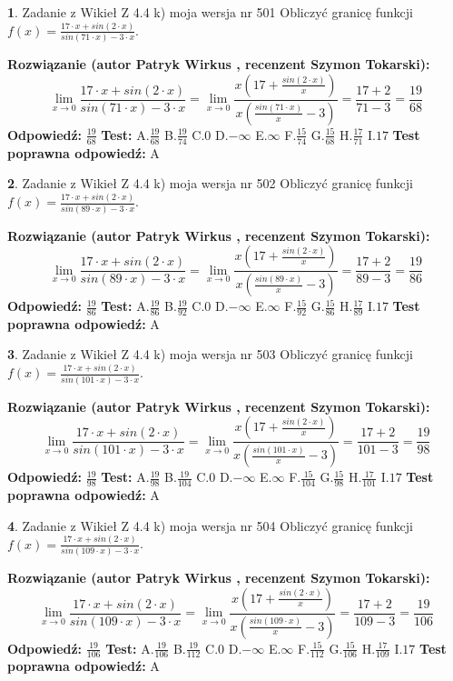 \documentclass[12pt, a4paper]{article}
\theoremstyle{definition} %
\newtheorem{zad}{}
\newcommand{\zadStart}[1]{\begin{zad}#1\newline}
\newcommand{\zadStop}{\end{zad}}
\newcommand{\rozwStart}[2]{\noindent \textbf{Rozwiązanie (autor #1 , recenzent #2): }\newline}
\newcommand{\rozwStop}{\newline}
\newcommand{\odpStart}{\noindent \textbf{Odpowiedź:}\newline}
\newcommand{\odpStop}{\newline}
\newcommand{\testStart}{\noindent \textbf{Test:}\newline}
\newcommand{\testStop}{\newline}
\newcommand{\kluczStart}{\noindent \textbf{Test poprawna odpowiedź:}\newline}
\newcommand{\kluczStop}{\newline}
\begin{document}
\zadStart{Zadanie z Wikieł Z 4.4 k) moja wersja nr 501}
Obliczyć granicę funkcji $f(x)=\frac{17\cdot x +sin(2\cdot x)}{sin(71\cdot x) -3\cdot x}$.
\zadStop
\rozwStart{Patryk Wirkus}{Szymon Tokarski}
$$\lim\limits_{x\to 0}\frac{17\cdot x +sin(2\cdot x)}{sin(71\cdot x) -3\cdot x}
=\lim\limits_{x\to 0}\frac{x(17+\frac{sin(2\cdot x)}{x})}{x(\frac{sin(71\cdot x)}{x}-3)}
=\frac{17+2}{71-3} = \frac{19}{68}$$
\rozwStop
\odpStart
$\frac{19}{68}$
\odpStop
\testStart
A.$\frac{19}{68}$
B.$\frac{19}{74}$
C.$0$
D.$-\infty$
E.$\infty$
F.$\frac{15}{74}$
G.$\frac{15}{68}$
H.$\frac{17}{71}$
I.$17$
\testStop
\kluczStart
A
\kluczStop



\zadStart{Zadanie z Wikieł Z 4.4 k) moja wersja nr 502}
Obliczyć granicę funkcji $f(x)=\frac{17\cdot x +sin(2\cdot x)}{sin(89\cdot x) -3\cdot x}$.
\zadStop
\rozwStart{Patryk Wirkus}{Szymon Tokarski}
$$\lim\limits_{x\to 0}\frac{17\cdot x +sin(2\cdot x)}{sin(89\cdot x) -3\cdot x}
=\lim\limits_{x\to 0}\frac{x(17+\frac{sin(2\cdot x)}{x})}{x(\frac{sin(89\cdot x)}{x}-3)}
=\frac{17+2}{89-3} = \frac{19}{86}$$
\rozwStop
\odpStart
$\frac{19}{86}$
\odpStop
\testStart
A.$\frac{19}{86}$
B.$\frac{19}{92}$
C.$0$
D.$-\infty$
E.$\infty$
F.$\frac{15}{92}$
G.$\frac{15}{86}$
H.$\frac{17}{89}$
I.$17$
\testStop
\kluczStart
A
\kluczStop



\zadStart{Zadanie z Wikieł Z 4.4 k) moja wersja nr 503}
Obliczyć granicę funkcji $f(x)=\frac{17\cdot x +sin(2\cdot x)}{sin(101\cdot x) -3\cdot x}$.
\zadStop
\rozwStart{Patryk Wirkus}{Szymon Tokarski}
$$\lim\limits_{x\to 0}\frac{17\cdot x +sin(2\cdot x)}{sin(101\cdot x) -3\cdot x}
=\lim\limits_{x\to 0}\frac{x(17+\frac{sin(2\cdot x)}{x})}{x(\frac{sin(101\cdot x)}{x}-3)}
=\frac{17+2}{101-3} = \frac{19}{98}$$
\rozwStop
\odpStart
$\frac{19}{98}$
\odpStop
\testStart
A.$\frac{19}{98}$
B.$\frac{19}{104}$
C.$0$
D.$-\infty$
E.$\infty$
F.$\frac{15}{104}$
G.$\frac{15}{98}$
H.$\frac{17}{101}$
I.$17$
\testStop
\kluczStart
A
\kluczStop



\zadStart{Zadanie z Wikieł Z 4.4 k) moja wersja nr 504}
Obliczyć granicę funkcji $f(x)=\frac{17\cdot x +sin(2\cdot x)}{sin(109\cdot x) -3\cdot x}$.
\zadStop
\rozwStart{Patryk Wirkus}{Szymon Tokarski}
$$\lim\limits_{x\to 0}\frac{17\cdot x +sin(2\cdot x)}{sin(109\cdot x) -3\cdot x}
=\lim\limits_{x\to 0}\frac{x(17+\frac{sin(2\cdot x)}{x})}{x(\frac{sin(109\cdot x)}{x}-3)}
=\frac{17+2}{109-3} = \frac{19}{106}$$
\rozwStop
\odpStart
$\frac{19}{106}$
\odpStop
\testStart
A.$\frac{19}{106}$
B.$\frac{19}{112}$
C.$0$
D.$-\infty$
E.$\infty$
F.$\frac{15}{112}$
G.$\frac{15}{106}$
H.$\frac{17}{109}$
I.$17$
\testStop
\kluczStart
A
\kluczStop
\end{document}
